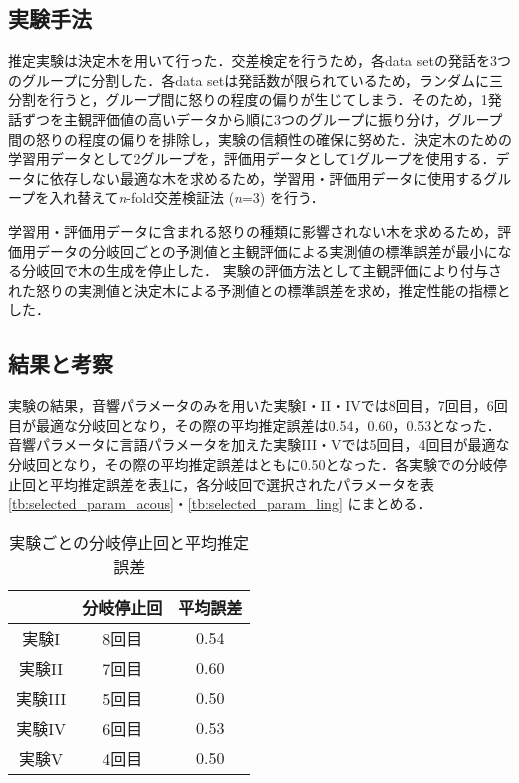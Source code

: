 \documentclass[japanese]{jnlp_1.3c}
\begin{document}
\subsection{実験手法}
推定実験は決定木を用いて行った．交差検定を行うため，各data setの発話を3つのグループに分割した．各data setは発話数が限られているため，ランダムに三分割を行うと，グループ間に怒りの程度の偏りが生じてしまう．そのため，1発話ずつを主観評価値の高いデータから順に3つのグループに振り分け，グループ間の怒りの程度の偏りを排除し，実験の信頼性の確保に努めた．決定木のための学習用データとして2グループを，評価用データとして1グループを使用する．データに依存しない最適な木を求めるため，学習用・評価用データに使用するグループを入れ替えて{\it n}-fold交差検証法 ({\it n}=3) を行う．

学習用・評価用データに含まれる怒りの種類に影響されない木を求めるため，評価用データの分岐回ごとの予測値と主観評価による実測値の標準誤差が最小になる分岐回で木の生成を停止した．
実験の評価方法として主観評価により付与された怒りの実測値と決定木による予測値との標準誤差を求め，推定性能の指標とした．

\subsection{結果と考察}
実験の結果，音響パラメータのみを用いた実験I・II・IVでは8回目，7回目，6回目が最適な分岐回となり，その際の平均推定誤差は0.54，0.60，0.53となった．音響パラメータに言語パラメータを加えた実験III・Vでは5回目，4回目が最適な分岐回となり，その際の平均推定誤差はともに0.50となった．各実験での分岐停止回と平均推定誤差を表\ref{tb:result}に，各分岐回で選択されたパラメータを表\ref{tb:selected_param_acous}・\ref{tb:selected_param_ling}
にまとめる．

\begin{table}[b] 
\caption{実験ごとの分岐停止回と平均推定誤差}
\label{tb:result}
\begin{center}
\begin{tabular}{ccc}
\hline
&分岐停止回&平均誤差 \\ \hline
実験I&8回目&0.54 \\
実験II&7回目&0.60 \\
実験III&5回目&0.50 \\
実験IV&6回目&0.53 \\
実験V&4回目&0.50 \\ \hline
\end{tabular}
\end{center}
\end{table}
\end{document}
